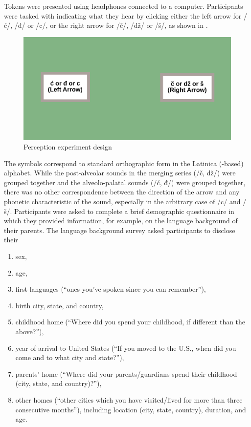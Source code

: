 \documentclass[output=paper,modfonts,newtxmath,hidelinks,]{langscibook}
\begin{document}
Tokens were presented using headphones connected to a computer. Participants were tasked with indicating what they hear by clicking either the left arrow for /ć/, /đ/ or /c/, or the right arrow for /č/, /dž/ or /š/, as shown in .

\begin{figure}[t]
\includegraphics[height=.3\textheight]{figures/MCFigure4.pdf}
\caption{\label{fig:mihajlovic:4} Perception experiment design}
\end{figure}

The symbols correspond to standard orthographic form in the Latinica (-based) alphabet. While the post-alveolar sounds in the merging series (/č, dž/) were grouped together and the alveolo-palatal sounds (/ć, đ/) were grouped together, there was no other correspondence between the direction of the arrow and any phonetic characteristic of the sound, especially in the arbitrary case of /c/ and /š/. Participants were asked to complete a brief demographic questionnaire in which they provided information, for example, on the language background of their parents. The language background survey asked participants to disclose their

\begin{enumerate}
\item sex, 
\item age, 
\item first languages (“ones you’ve spoken since you can remember”), 
\item birth city, state, and country,
\item childhood home (“Where did you spend your childhood, if different than the above?”), 
\item year of arrival to United States (“If you moved to the U.S., when did you come and to what city and state?”), 
\item parents’ home (“Where did your parents/guardians spend their childhood (city, state, and country)?”),
\item other homes (“other cities which you have visited/lived for more than three consecutive months”), including location (city, state, country), duration, and age.
\end{enumerate}
\end{document}
